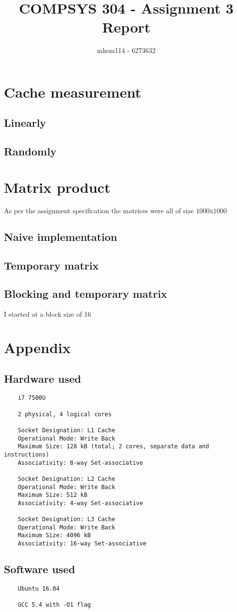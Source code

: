 \documentclass[10pt,a4paper,oneside]{article}
\author{mkem114 - 6273632}
\title{COMPSYS 304 - Assignment 3 Report}
\begin{document}
    \maketitle

    \section{Cache measurement}
    \subsection{Linearly}
    \subsection{Randomly}

    \section{Matrix product}
    As per the assignment specification the matrices were all of size $1000$x$1000$
    \subsection{Naive implementation}
    \subsection{Temporary matrix}
    \subsection{Blocking and temporary matrix}
    I started at a block size of 16

    \section*{Appendix}
        \subsection*{Hardware used}
            \begin{verbatim}
    i7 7500U

    2 physical, 4 logical cores

    Socket Designation: L1 Cache
    Operational Mode: Write Back
    Maximum Size: 128 kB (total; 2 cores, separate data and instructions)
    Associativity: 8-way Set-associative

    Socket Designation: L2 Cache
    Operational Mode: Write Back
    Maximum Size: 512 kB
    Associativity: 4-way Set-associative

    Socket Designation: L3 Cache
    Operational Mode: Write Back
    Maximum Size: 4096 kB
    Associativity: 16-way Set-associative
            \end{verbatim}
        \subsection*{Software used}
            \begin{verbatim}
    Ubuntu 16.04

    GCC 5.4 with -O1 flag
            \end{verbatim}
\end{document}

